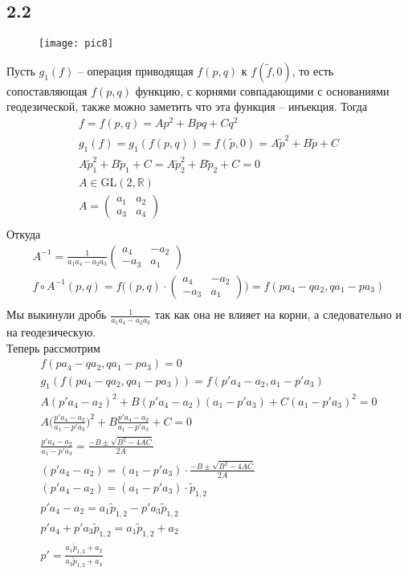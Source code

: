 		\subsection*{2.2}
		\begin{figure}[h]
			\texttt{[image: pic8]}
		\end{figure}
		\noindent
		Пусть $g_1(f)$ -- операция приводящая $f(p,q)$ к $f(\tilde{f},0)$, то есть сопоставляющая $f(p,q)$ функцию, с корнями совпадающими с основаниями геодезической, также можно заметить что эта функция -- инъекция. 
		Тогда
		\begin{gather*}
			f = f(p,q) = Ap^2 + Bpq + Cq^2\\
			g_1(f) = g_1(f(p,q)) = f(\tilde{p}, 0) = A\tilde{p}^2 + B\tilde{p} + C\\
			A\tilde{p}_1^2 + B\tilde{p}_1 + C = A\tilde{p}_2^2 + B\tilde{p}_2 + C = 0\\
			A \in \text{GL}(2,\mathbb{R})\\
			A = 
			\begin{pmatrix}
				a_1 & a_2\\
				a_3 & a_4
			\end{pmatrix}\\
		\end{gather*}
		Откуда
		\begin{gather*}
			A^{-1} = 
			\frac{1}{a_1a_4 - a_2a_3}
			\begin{pmatrix}
				a_4 & -a_2\\
				-a_3 & a_1
			\end{pmatrix}\\
			f \circ A^{-1} (p,q) = f\Bigg((p,q) \cdot 
			\begin{pmatrix}
				a_4 & -a_2\\
				-a_3 & a_1
			\end{pmatrix}\Bigg)
			=
			f(pa_4-qa_2, qa_1 - pa_3)\\
		\end{gather*}
		Мы выкинули дробь $\frac{1}{a_1a_4 - a_2a_3}$ так как она не влияет на корни, а следовательно и на геодезическую.\\
		Теперь рассмотрим
		\begin{gather*}
			f(pa_4-qa_2, qa_1 - pa_3) = 0\\
			g_1(f(pa_4-qa_2, qa_1 - pa_3)) = f(p'a_4-a_2, a_1 - p'a_3)\\
			A(p'a_4 - a_2)^2 + B(p'a_4 - a_2)(a_1 - p'a_3) + C(a_1 - p'a_3)^2 = 0\\
			A\Bigg(\frac{p'a_4 - a_2}{a_1 - p'a_3}\Bigg)^2 + B\frac{p'a_4 - a_2}{a_1 - p'a_3} + C = 0\\
			\frac{p'a_4 - a_2}{a_1 - p'a_3} = \frac{-B \pm \sqrt{B^2 - 4AC}}{2A}\\
			(p'a_4 - a_2) = (a_1 - p'a_3) \cdot \frac{-B \pm \sqrt{B^2 - 4AC}}{2A}\\
			(p'a_4 - a_2) = (a_1 - p'a_3) \cdot \tilde{p}_{1,2}\\
			p'a_4 - a_2 = a_1\tilde{p}_{1,2} - p'a_3\tilde{p}_{1,2}\\
			p'a_4 +	p'a_3\tilde{p}_{1,2} = a_1\tilde{p}_{1,2} + a_2\\
			p'= \frac{a_1\tilde{p}_{1,2} + a_2}{a_3\tilde{p}_{1,2} + a_4}
		\end{gather*}

